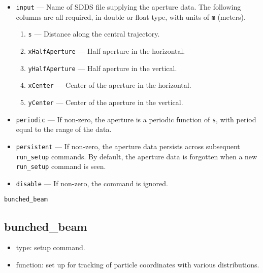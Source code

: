 \documentclass[11pt]{article}
\begin{document}
\begin{itemize}
\item \verb|input| --- Name of SDDS file supplying the aperture data.  The following columns are
  all required, in double or float type, with units of \verb|m| (meters).
  \begin{enumerate}
    \item \verb|s| --- Distance along the central trajectory.  
    \item \verb|xHalfAperture| --- Half aperture in the horizontal. 
    \item \verb|yHalfAperture| --- Half aperture in the vertical.
    \item \verb|xCenter| --- Center of the aperture in the horizontal.
    \item \verb|yCenter| --- Center of the aperture in the vertical.
  \end{enumerate}
\item \verb|periodic| --- If non-zero, the aperture is a periodic function of \verb|s|, with period equal
  to the range of the data.
\item \verb|persistent| --- If non-zero, the aperture data persists across subsequent \verb|run_setup| commands.
  By default, the aperture data is forgotten when a new \verb|run_setup| command is seen.
\item \verb|disable| --- If non-zero, the command is ignored.
\end{itemize}

\begin{latexonly}
\newpage
\begin{center}{\Large\verb|bunched_beam|}\end{center}
\end{latexonly}
\subsection{bunched\_beam \label{subsec:bunchedbeam}}

\begin{itemize}
\item type: setup command.
\item function: set up for tracking of particle coordinates with various distributions.
\end{itemize}
\end{document}
